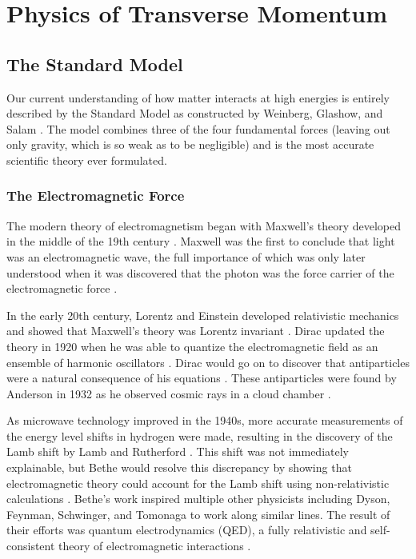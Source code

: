 \chapter{Physics of \texorpdfstring{\Z}{Z} Transverse Momentum}
\label{chapter:theory}

\section{The Standard Model}
\label{section:standard_model}

Our current understanding of how matter interacts at high energies is entirely
described by the Standard Model as constructed by Weinberg, Glashow, and Salam
\cite{glashow1961,weinberg1967,salam1968}. The model combines three of the four
fundamental forces (leaving out only gravity, which is so weak as to be
negligible) and is the most accurate scientific theory ever formulated.

\subsection{The Electromagnetic Force}
\label{subsection:electronmagnetic_force}

The modern theory of electromagnetism began with Maxwell's theory developed in
the middle of the 19th century \cite{maxwell1873}. Maxwell was the first to
conclude that light was an electromagnetic wave, the full importance of which
was only later understood when it was discovered that the photon was the force
carrier of the electromagnetic force \cite{maxwell1865}.

In the early 20th century, Lorentz and Einstein developed relativistic
mechanics and showed that Maxwell's theory was Lorentz invariant
\cite{lorentz1899,einstein1904}. Dirac updated the theory in 1920 when he was
able to quantize the electromagnetic field as an ensemble of harmonic
oscillators \cite{dirac1927}. Dirac would go on to discover that antiparticles
were a natural consequence of his equations \cite{dirac1928,dirac1930}. These
antiparticles were found by Anderson in 1932 as he observed cosmic rays in a
cloud chamber \cite{anderson1933}.

As microwave technology improved in the 1940s, more accurate measurements of
the energy level shifts in hydrogen were made, resulting in the discovery of
the Lamb shift by Lamb and Rutherford \cite{lamb1947}. This shift was not
immediately explainable, but Bethe would resolve this discrepancy by showing
that electromagnetic theory could account for the Lamb shift using
non-relativistic calculations \cite{bethe1947}. Bethe's work inspired multiple
other physicists including Dyson, Feynman, Schwinger, and Tomonaga to work
along similar lines. The result of their efforts was quantum electrodynamics
(QED), a fully relativistic and self-consistent theory of electromagnetic
interactions \cite{tomonaga1946,schwinger1948,feynman1949,dyson1949}.

